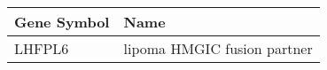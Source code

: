 \begin{tabular}{ll}
\toprule
Gene Symbol &                        Name \\
\midrule
     LHFPL6 & lipoma HMGIC fusion partner \\
\bottomrule
\end{tabular}
